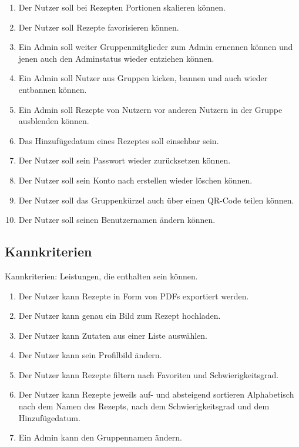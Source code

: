 \documentclass[parskip=full]{scrartcl}
\begin{document}
\begin{enumerate}[start=1,label={$\langle$\bfseries RS\arabic*$\rangle$}, leftmargin = 5em, itemsep=4pt, parsep=4pt]
    
    \item Der Nutzer soll bei Rezepten Portionen skalieren können.\label{RS1}
    \item Der Nutzer soll Rezepte favorisieren können.\label{RS2}
    \item Ein Admin soll weiter Gruppenmitglieder zum Admin ernennen können und jenen auch den Adminstatus wieder entziehen können.\label{RS3}
    \item Ein Admin soll Nutzer aus Gruppen kicken, bannen und auch wieder entbannen können.\label{RS4}
    \item Ein Admin soll Rezepte von Nutzern vor anderen Nutzern in der Gruppe ausblenden können.\label{RS5}
    \item Das Hinzufügedatum eines Rezeptes soll einsehbar sein.\label{RS7}
    \item Der Nutzer soll sein Passwort wieder zurücksetzen können.\label{RS8}
    \item Der Nutzer soll sein Konto nach erstellen wieder löschen können.\label{RS9}
    \item Der Nutzer soll das Gruppenkürzel auch über einen QR-Code teilen können.\label{RS10}
    \item Der Nutzer soll seinen Benutzernamen ändern können.\label{RS11}
\end{enumerate}

\subsection{Kannkriterien}
Kannkriterien: Leistungen, die enthalten sein können.

\begin{enumerate}[start=1,label={$\langle$\bfseries RC\arabic*$\rangle$}, leftmargin = 5em, itemsep=4pt, parsep=4pt]
    \item Der Nutzer kann Rezepte in Form von PDFs exportiert werden.\label{RC1}
    \item Der Nutzer kann genau ein Bild zum Rezept hochladen.\label{RC2}
    \item Der Nutzer kann Zutaten aus einer Liste auswählen.\label{RC3}
    \item Der Nutzer kann sein Profilbild ändern.\label{RC4}
    \item Der Nutzer kann Rezepte filtern nach Favoriten und Schwierigkeitsgrad.\label{RC5}
    \item Der Nutzer kann Rezepte jeweils auf- und absteigend sortieren Alphabetisch nach dem Namen des Rezepts, nach dem Schwierigkeitsgrad und dem Hinzufügedatum.\label{RC6}
    \item Ein Admin kann den Gruppennamen ändern.\label{RC7}
\end{enumerate}
\end{document}
